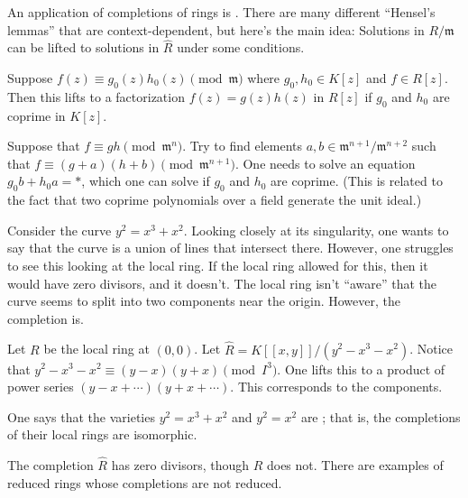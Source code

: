 \documentclass [11 pt, oneside] {article}
\begin{document}
An application of completions of rings is . There are many different ``Hensel's lemmas'' that are context-dependent, but here's the main idea: Solutions in $R/\mathfrak{m}$ can be lifted to solutions in $\widehat{R}$ under some conditions.

\begin{example}\label{}\text{}
Suppose $f(z)\equiv g_0(z) h_0(z)\pmod{\mathfrak{m}}$ where $g_0,h_0\in K[z]$ and $f\in R[z]$. Then this lifts to a factorization $f(z)=g (z)h (z)$ in $R[z]$ if $g_0$ and $h_0$ are coprime in $K[z]$.
\end{example}

\begin{esquisse}
	Suppose that $f\equiv gh\pmod{\mathfrak{m}^n}$. Try to find elements $a,b\in \mathfrak{m}^{n+1}/\mathfrak{m}^{n+2}$ such that $f\equiv (g+a) (h+b)\pmod { \mathfrak{m}^{n+1}}$. One needs to solve an equation $g_0b+h_0a = *$, which one can solve if $g_0$ and $h_0$ are coprime. (This is related to the fact that two coprime polynomials over a field generate the unit ideal.)
\end{esquisse}

\begin{example}[ ]\label{}\text{}
Consider the curve $y^2 = x^3+x^2$. Looking closely at its singularity, one wants to say that the curve is a union of lines that intersect there. However, one struggles to see this looking at the local ring. If the local ring allowed for this, then it would have zero divisors, and it doesn't. The local ring isn't ``aware'' that the curve seems to split into two components near the origin. However, the completion is. 

Let $R$ be the local ring at $(0,0)$. Let $\widehat{R} = K [\![x,y]\!]/(y^2-x^3-x^2)$. Notice that $y^2-x^3-x^2\equiv (y-x) (y+x)\pmod {I^3}$. One lifts this to a product of power series $(y-x+\cdots) (y+x+\cdots)$. This corresponds to the components.
\end{example}

\begin{remark}
	One says that the varieties $y^2=x^3+x^2$ and $y^2=x^2$ are ; that is, the completions of their local rings are isomorphic.
\end{remark}

\begin{remark}
	The completion $\widehat{R}$ has zero divisors, though $R$ does not. There are examples of reduced rings whose completions are not reduced.
\end{remark}
\end{document}
